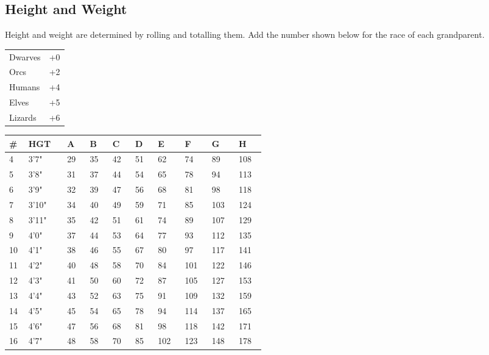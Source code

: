 \begin{multicols*}{2}
\section{Height and Weight}
Height and weight are determined by rolling  and totalling them. Add the number shown below for the race of each grandparent.
\begin{tcolorbox}[breakable,boxrule=0pt,title=\textbf{Height Roll Racial Modifier}]
\begin{tabular}{l l}
Dwarves & +0\\
Orcs & +2\\
Humans & +4\\
Elves & +5\\
Lizards & +6\\
\end{tabular}
\end{tcolorbox}
\begin{tcolorbox}[breakable,boxrule=0pt,title=\textbf{Height and Weight Table}]
\begin{tabular}{@{} p{0.02\linewidth} p{0.07\linewidth} p{0.05\linewidth} p{0.05\linewidth} p{0.05\linewidth} p{0.05\linewidth} p{0.05\linewidth} p{0.05\linewidth} p{0.05\linewidth} p{0.05\linewidth} }
\# & HGT & A & B & C & D & E & F & G & H\\
\midrule
4 & 3'7" & 29 & 35 & 42 & 51 & 62 & 74 & 89 & 108\\
5 & 3'8" & 31 & 37 & 44 & 54 & 65 & 78 & 94 & 113\\
6 & 3'9" & 32 & 39 & 47 & 56 & 68 & 81 & 98 & 118\\
7 & 3'10" & 34 & 40 & 49 & 59 & 71 & 85 & 103 & 124\\
8 & 3'11" & 35 & 42 & 51 & 61 & 74 & 89 & 107 & 129\\
9 & 4'0" & 37 & 44 & 53 & 64 & 77 & 93 & 112 & 135\\
10 & 4'1" & 38 & 46 & 55 & 67 & 80 & 97 & 117 & 141\\
11 & 4'2" & 40 & 48 & 58 & 70 & 84 & 101 & 122 & 146\\
12 & 4'3" & 41 & 50 & 60 & 72 & 87 & 105 & 127 & 153\\
13 & 4'4" & 43 & 52 & 63 & 75 & 91 & 109 & 132 & 159\\
14 & 4'5" & 45 & 54 & 65 & 78 & 94 & 114 & 137 & 165\\
15 & 4'6" & 47 & 56 & 68 & 81 & 98 & 118 & 142 & 171\\
16 & 4'7" & 48 & 58 & 70 & 85 & 102 & 123 & 148 & 178\\

\end{tabular}
\end{tcolorbox}
\end{multicols*}
